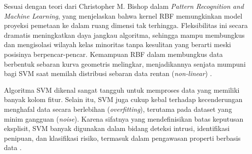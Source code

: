     Sesuai dengan teori dari Christopher M. Bishop  \cite{bishop2006pattern} dalam \textit{Pattern Recognition and Machine Learning}, yang menjelaskan bahwa kernel RBF memungkinkan model proyeksi pemetaan ke dalam ruang dimensi tak terhingga. Fleksibilitas ini secara dramatis meningkatkan daya jangkau algoritma, sehingga mampu membungkus dan mengisolasi wilayah kelas minoritas tanpa kesulitan yang berarti meski posisinya berpencar-pencar. Kemampuan RBF dalam membungkus data berbentuk sebaran kurva geometris melingkar, menjadikannya senjata mumpuni bagi SVM saat memilah distribusi sebaran data rentan (\textit{non-linear}) \cite{burges1998tutorial}.
    
    Algoritma SVM dikenal sangat tangguh untuk memproses data yang memiliki banyak kolom fitur. Selain itu, SVM juga cukup kebal terhadap kecenderungan menghafal data secara berlebihan ({\it overfitting}), terutama pada dataset yang minim gangguan ({\it noise}). Karena sifatnya yang mendefinisikan batas keputusan eksplisit, SVM banyak digunakan dalam bidang deteksi intrusi, identifikasi penipuan, dan klasifikasi risiko, termasuk dalam pengawasan properti berbasis data \cite{scholkopf2002learning}.
